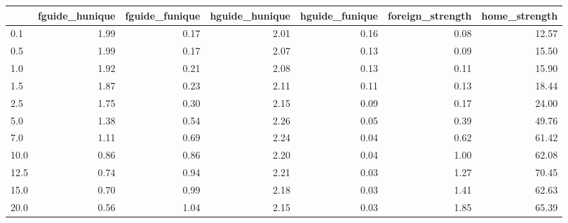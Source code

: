 \begin{tabular}{lrrrrrr}
\toprule
 & fguide_hunique & fguide_funique & hguide_hunique & hguide_funique & foreign_strength & home_strength \\
\midrule
0.1 & 1.99 & 0.17 & 2.01 & 0.16 & 0.08 & 12.57 \\
0.5 & 1.99 & 0.17 & 2.07 & 0.13 & 0.09 & 15.50 \\
1.0 & 1.92 & 0.21 & 2.08 & 0.13 & 0.11 & 15.90 \\
1.5 & 1.87 & 0.23 & 2.11 & 0.11 & 0.13 & 18.44 \\
2.5 & 1.75 & 0.30 & 2.15 & 0.09 & 0.17 & 24.00 \\
5.0 & 1.38 & 0.54 & 2.26 & 0.05 & 0.39 & 49.76 \\
7.0 & 1.11 & 0.69 & 2.24 & 0.04 & 0.62 & 61.42 \\
10.0 & 0.86 & 0.86 & 2.20 & 0.04 & 1.00 & 62.08 \\
12.5 & 0.74 & 0.94 & 2.21 & 0.03 & 1.27 & 70.45 \\
15.0 & 0.70 & 0.99 & 2.18 & 0.03 & 1.41 & 62.63 \\
20.0 & 0.56 & 1.04 & 2.15 & 0.03 & 1.85 & 65.39 \\
\bottomrule
\end{tabular}
